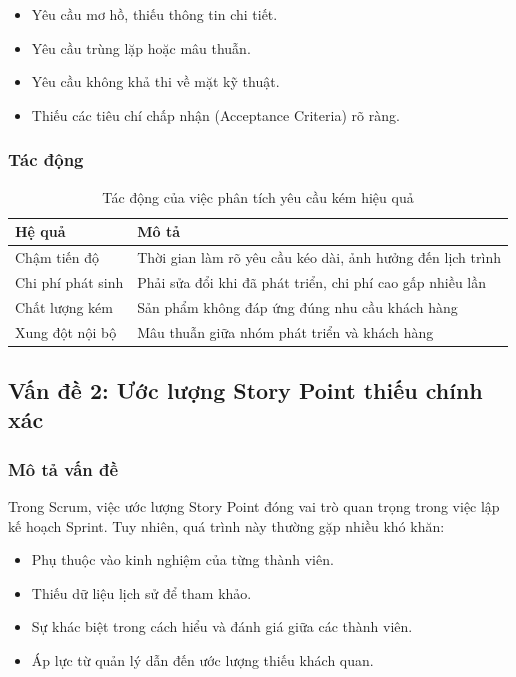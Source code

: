 \documentclass[12pt,a4paper]{report}
\begin{document}
\begin{itemize}
\item Yêu cầu mơ hồ, thiếu thông tin chi tiết.
\item Yêu cầu trùng lặp hoặc mâu thuẫn.
\item Yêu cầu không khả thi về mặt kỹ thuật.
\item Thiếu các tiêu chí chấp nhận (Acceptance Criteria) rõ ràng.
\end{itemize}

\subsubsection{Tác động}

\begin{table}[H]
\centering
\caption{Tác động của việc phân tích yêu cầu kém hiệu quả}
\begin{tabular}{|p{5cm}|p{8cm}|}
\hline
\textbf{Hệ quả} & \textbf{Mô tả} \\
\hline
Chậm tiến độ & Thời gian làm rõ yêu cầu kéo dài, ảnh hưởng đến lịch trình \\
\hline
Chi phí phát sinh & Phải sửa đổi khi đã phát triển, chi phí cao gấp nhiều lần \\
\hline
Chất lượng kém & Sản phẩm không đáp ứng đúng nhu cầu khách hàng \\
\hline
Xung đột nội bộ & Mâu thuẫn giữa nhóm phát triển và khách hàng \\
\hline
\end{tabular}
\label{tab:requirement_impact}
\end{table}

\subsection{Vấn đề 2: Ước lượng Story Point thiếu chính xác}

\subsubsection{Mô tả vấn đề}

Trong Scrum, việc ước lượng Story Point đóng vai trò quan trọng trong việc lập kế hoạch Sprint. Tuy nhiên, quá trình này thường gặp nhiều khó khăn:

\begin{itemize}
\item Phụ thuộc vào kinh nghiệm của từng thành viên.
\item Thiếu dữ liệu lịch sử để tham khảo.
\item Sự khác biệt trong cách hiểu và đánh giá giữa các thành viên.
\item Áp lực từ quản lý dẫn đến ước lượng thiếu khách quan.
\end{itemize}
\end{document}
